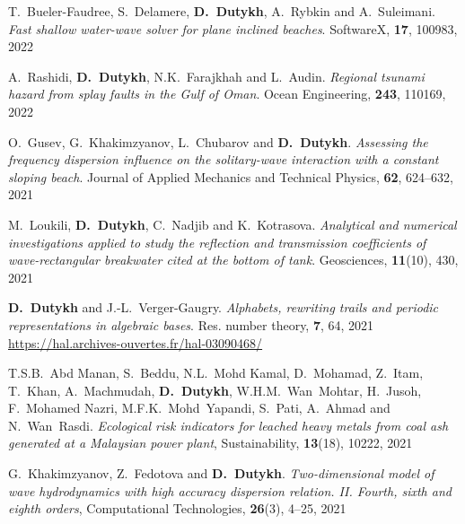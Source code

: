\documentclass[final, a4paper, oneside, 12pt]{article}
\numberwithin{equation}{section}
\begin{document}
\begin{etaremune}
  \item T.~Bueler-Faudree, S.~Delamere, \textbf{D.~Dutykh}, A.~Rybkin and A.~Suleimani. \textit{Fast shallow water-wave solver for plane inclined beaches}. SoftwareX, \textbf{17}, 100983, 2022 %
  
  \item A.~Rashidi, \textbf{D.~Dutykh}, N.K.~Farajkhah and L.~Audin. \textit{Regional tsunami hazard from splay faults in the Gulf of Oman}. Ocean Engineering, \textbf{243}, 110169, 2022 %

  
  \item O.~Gusev, G.~Khakimzyanov, L.~Chubarov and \textbf{D.~Dutykh}. \textit{Assessing the frequency dispersion influence on the solitary-wave interaction with a constant sloping beach}. Journal of Applied Mechanics and Technical Physics, \textbf{62}, 624--632, 2021 %
  
  \item M.~Loukili, \textbf{D.~Dutykh}, C.~Nadjib and K.~Kotrasova. \textit{Analytical and numerical investigations applied to study the reflection and transmission coefficients of wave-rectangular breakwater cited at the bottom of tank}. Geosciences, \textbf{11}(10), 430, 2021 %
  
  \item \textbf{D.~Dutykh} and J.-L.~Verger-Gaugry. \textit{Alphabets, rewriting trails and periodic representations in algebraic bases}. Res. number theory, \textbf{7}, 64, 2021 \\ %
  \url{https://hal.archives-ouvertes.fr/hal-03090468/}
  
  \item T.S.B.~Abd Manan, S.~Beddu, N.L.~Mohd Kamal, D.~Mohamad, Z.~Itam, T.~Khan, A.~Machmudah, \textbf{D.~Dutykh}, W.H.M.~Wan~Mohtar, H.~Jusoh, F.~Mohamed Nazri, M.F.K.~Mohd~Yapandi, S.~Pati, A.~Ahmad and N.~Wan~Rasdi. \textit{Ecological risk indicators for leached heavy metals from coal ash generated at a Malaysian power plant}, Sustainability, \textbf{13}(18), 10222, 2021 %
  
  \item G.~Khakimzyanov, Z.~Fedotova and \textbf{D.~Dutykh}. \textit{Two-dimensional model of wave hydrodynamics with high accuracy dispersion relation. II. Fourth, sixth and eighth orders}, Computational Technologies, \textbf{26}(3), 4--25, 2021 %
  

\end{etaremune}
\end{document}
